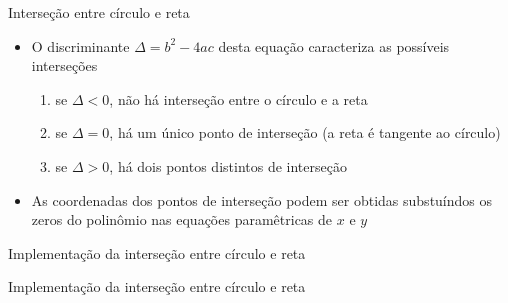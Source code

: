 \begin{frame}[fragile]{Interseção entre círculo e reta}

    \begin{itemize}
        \item O discriminante $\Delta = b^2 - 4ac$  desta equação caracteriza as possíveis 
            interseções
        \pause

        \begin{enumerate}
            \item se $\Delta < 0$, não há interseção entre o círculo e a reta
            \pause
            \item se $\Delta = 0$, há um único ponto de interseção (a reta é tangente ao círculo)
            \pause
            \item se $\Delta > 0$, há dois pontos distintos de interseção
        \end{enumerate}
        \pause

        \item As coordenadas dos pontos de interseção podem ser obtidas substuíndos os zeros
            do polinômio nas equações paramêtricas de $x$ e $y$
    \end{itemize}

\end{frame}

\begin{frame}[fragile]{Implementação da interseção entre círculo e reta}
\end{frame}

\begin{frame}[fragile]{Implementação da interseção entre círculo e reta}
\end{frame}
